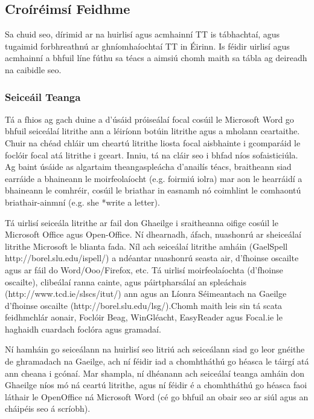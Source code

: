 \begin{multicols}{2}
\subsection{Croíréimsí Feidhme} 

Sa chuid seo, dírimid ar na huirlisí agus acmhainní TT is tábhachtaí, agus tugaimid forbhreathnú ar ghníomhaíochtaí TT in Éirinn. Is féidir uirlisí agus acmhainní a bhfuil líne fúthu sa téacs a aimsiú chomh maith sa tábla ag deireadh na caibidle seo. 

\subsubsection{Seiceáil Teanga}

Tá a fhios ag gach duine a d’úsáid próiseálaí focal cosúil le Microsoft Word go bhfuil seiceálaí litrithe ann a léiríonn botúin litrithe agus a mholann ceartaithe. Chuir na chéad chláir um cheartú litrithe liosta focal aisbhainte i gcomparáid le foclóir focal atá litrithe i gceart. Inniu, tá na cláir seo i bhfad níos sofaisticiúla. Ag baint úsáide as algartaim theangaspleácha d’anailís téacs, braitheann siad earráide a bhaineann le moirfeolaíocht (e.g. foirmiú iolra) mar aon le hearráidí a bhaineann le comhréir, cosúil le briathar in easnamh nó coimhlint le comhaontú briathair-ainmní (e.g. she *write a letter). 

Tá uirlisí seiceála litrithe ar fail don Ghaeilge i sraitheanna oifige cosúil le Microsoft Office agus Open-Office. Ní dhearnadh, áfach, nuashonrú ar sheiceálaí litrithe Microsoft le blianta fada. Níl ach seiceálaí litrithe amháin (GaelSpell http://borel.slu.edu/ispell/) a ndéantar nuashonrú seasta air, d’fhoinse oscailte agus ar fáil do Word/Ooo/Firefox, etc. Tá uirlisí moirfeolaíochta (d’fhoinse oscailte), clibeálaí ranna cainte, agus páirtpharsálaí an spleáchais (http://www.tcd.ie/slscs/itut/) ann  agus an Líonra Séimeantach na Gaeilge d’fhoinse oscailte (http://borel.slu.edu/lsg/).Chomh maith leis sin tá scata feidhmchlár aonair, Foclóir Beag, WinGléacht, EasyReader agus Focal.ie le haghaidh cuardach foclóra agus gramadaí.


Ní hamháin go seiceálann na huirlisí seo litriú ach seiceálann siad go leor gnéithe de ghramadach na Gaeilge, ach ní féidir iad a chomhtháthú go héasca le táirgí atá ann cheana i gcónaí. Mar shampla, ní dhéanann ach seiceálaí teanga amháin don Ghaeilge \cite{gramadoir} níos mó ná ceartú litrithe, agus ní féidir é a chomhtháthú go héasca faoi láthair le OpenOffice ná Microsoft Word (cé go bhfuil an obair seo ar siúl agus an cháipéis seo á scríobh).  



\end{multicols}
